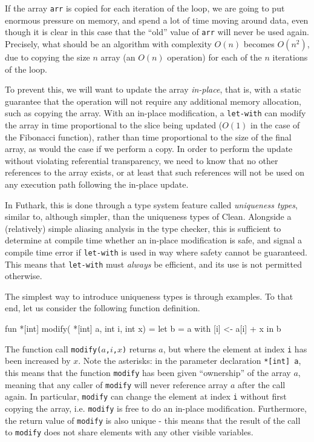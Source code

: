 \documentclass[oneside]{memoir}
\newcommand{\emp}[1]{\textcolor{DikuRed}{ #1}}
\begin{document}
If the array \texttt{arr} is copied for each iteration of the loop, we
are going to put enormous pressure on memory, and spend a lot of time
moving around data, even though it is clear in this case that the
``old'' value of \texttt{arr} will never be used again.  Precisely,
what should be an algorithm with complexity $O(n)$ becomes $O(n^2)$,
due to copying the size $n$ array (an $O(n)$ operation) for each of
the $n$ iterations of the loop.

To prevent this, we will want to update the array \textit{in-place},
that is, with a static guarantee that the operation will not require
any additional memory allocation, such as copying the array.  With an
in-place modification, a \texttt{let-with} can modify the array in
time proportional to the slice being updated ($O(1)$ in the case of
the Fibonacci function), rather than time proportional to the size of
the final array, as would the case if we perform a copy.  In order to
perform the update without violating referential transparency, we need
to know that no other references to the array exists, or at least that
such references will not be used on any execution path following the
in-place update.

In Futhark, this is done through a type system feature called
\textit{uniqueness types}, similar to, although simpler, than the
uniqueness types of Clean.  Alongside a (relatively) simple aliasing
analysis in the type checker, this is sufficient to determine at
compile time whether an in-place modification is safe, and signal a
compile time error if \texttt{let-with} is used in way where safety
cannot be guaranteed.  This means that \texttt{let-with} must
\textit{always} be efficient, and its use is not permitted otherwise.

The simplest way to introduce uniqueness types is through examples.
To that end, let us consider the following function definition.

\begin{colorcode}
fun \emp{*}[int] modify(\emp{*}[int] a, int i, int x) =
  let b = a with [i] <- a[i] + x in
  b
\end{colorcode}

The function call \texttt{modify($a$,$i$,$x$)} returns $a$, but where
the element at index \texttt{i} has been increased by $x$.  Note the
\emp{asterisks}: in the parameter declaration \texttt{*[int] a}, this
means that the function \texttt{modify} has been given ``ownership''
of the array $a$, meaning that any caller of \texttt{modify} will
never reference array $a$ after the call again.  In particular,
\texttt{modify} can change the element at index \texttt{i} without
first copying the array, i.e. \texttt{modify} is free to do an
in-place modification.  Furthermore, the return value of
\texttt{modify} is also unique - this means that the result of the
call to \texttt{modify} does not share elements with any other visible
variables.
\end{document}
